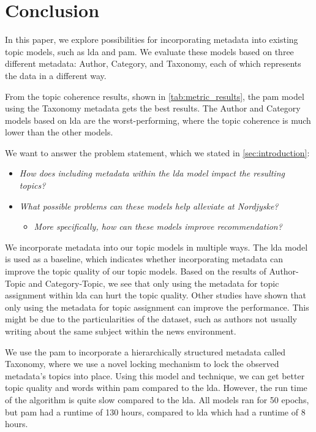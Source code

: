 \section{Conclusion}\label{sec:conclusion}
In this paper, we explore possibilities for incorporating metadata into existing topic models, such as \gls{lda} and \gls{pam}.
We evaluate these models based on three different metadata: Author, Category, and Taxonomy, each of which represents the data in a different way.

From the topic coherence results, shown in \autoref{tab:metric_results}, the \gls{pam} model using the Taxonomy metadata gets the best results.
The Author and Category models based on \gls{lda} are the worst-performing, where the topic coherence is much lower than the other models.

We want to answer the problem statement, which we stated in \autoref{sec:introduction}:

\begin{itemize}
	\item \textit{How does including metadata within the \gls{lda} model impact the resulting topics?}
	\item \textit{What possible problems can these models help alleviate at Nordjyske?}
	\begin{itemize}
		\item \textit{More specifically, how can these models improve recommendation?}
	\end{itemize}
\end{itemize}

We incorporate metadata into our topic models in multiple ways.
The \gls{lda} model is used as a baseline, which indicates whether incorporating metadata can improve the topic quality of our topic models.
Based on the results of Author-Topic and Category-Topic, we see that only using the metadata for topic assignment within \gls{lda} can hurt the topic quality.
Other studies have shown that only using the metadata for topic assignment can improve the performance.
This might be due to the particularities of the dataset, such as authors not usually writing about the same subject within the news environment.  


We use the \gls{pam} to incorporate a hierarchically structured metadata called Taxonomy, where we use a novel locking mechanism to lock the observed metadata's topics into place.
Using this model and technique, we can get better topic quality and words within \gls{pam} compared to the \gls{lda}.
However, the run time of the algorithm is quite slow compared to the \gls{lda}.
All models ran for 50 epochs, but \gls{pam} had a runtime of 130 hours, compared to \gls{lda} which had a runtime of 8 hours.

